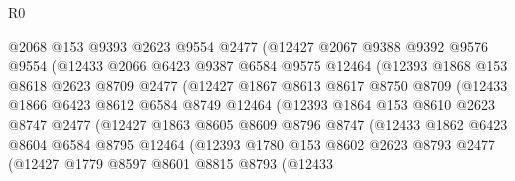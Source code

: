 \begin{lexlean}{R0}
\begin{coremodule}
                    @2068
                    @153
                    @9393
                    @2623
                    @9554
                    @2477
                    (@12427
                      @2067
                      @9388
                      @9392
                      @9576
                      @9554
                      (@12433
                        @2066
                        @6423
                        @9387
                        @6584
                        @9575
                        @12464
                        (@12393
                          @1868
                          @153
                          @8618
                          @2623
                          @8709
                          @2477
                          (@12427
                            @1867
                            @8613
                            @8617
                            @8750
                            @8709
                            (@12433
                              @1866
                              @6423
                              @8612
                              @6584
                              @8749
                              @12464
                              (@12393
                                @1864
                                @153
                                @8610
                                @2623
                                @8747
                                @2477
                                (@12427
                                  @1863
                                  @8605
                                  @8609
                                  @8796
                                  @8747
                                  (@12433
                                    @1862
                                    @6423
                                    @8604
                                    @6584
                                    @8795
                                    @12464
                                    (@12393
                                      @1780
                                      @153
                                      @8602
                                      @2623
                                      @8793
                                      @2477
                                      (@12427
                                        @1779
                                        @8597
                                        @8601
                                        @8815
                                        @8793
                                        (@12433

\end{coremodule}
\end{lexlean}
